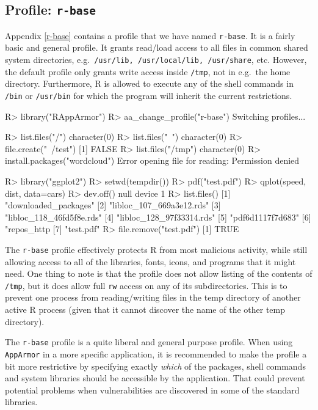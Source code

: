 \documentclass{jss}
\newcommand{\R}{\textsf{R}\xspace}
\newcommand{\AppArmor}{\texttt{AppArmor}\xspace}
\begin{document}
\subsection[Profile: r-base]{Profile: \texttt{r-base}}
\label{r-base-intro}

Appendix \ref{r-base} contains a profile that we have named \texttt{r-base}.
It is a fairly basic and general profile. It grants read/load access to all
files in common shared system directories, e.g.\ \texttt{/usr/lib,
/usr/local/lib, /usr/share}, etc. However, the default profile only grants
write access inside \texttt{/tmp}, not in e.g.\ the home directory. Furthermore,
\R is allowed to execute any of the shell commands in \texttt{/bin}
or \texttt{/usr/bin} for which the program will inherit the current
restrictions.

\begin{CodeChunk}
\begin{CodeInput}
R> library("RAppArmor")
R> aa_change_profile("r-base")
Switching profiles...

R> list.files("/")
character(0)
R> list.files("~")
character(0)
R> file.create("~/test")
[1] FALSE
R> list.files("/tmp")
character(0)
R> install.packages("wordcloud")
Error opening file for reading: Permission denied

R> library("ggplot2")
R> setwd(tempdir())
R> pdf("test.pdf")
R> qplot(speed, dist, data=cars)
R> dev.off()
null device
          1
R> list.files()
[1] "downloaded_packages"
[2] "libloc_107_669a3e12.rds"
[3] "libloc_118_46fd5f8e.rds"
[4] "libloc_128_97f33314.rds"
[5] "pdf6d1117f7d683"
[6] "repos_http%
[7] "test.pdf"
R> file.remove("test.pdf")
[1] TRUE
\end{CodeInput}
\end{CodeChunk}

The \texttt{r-base} profile effectively protects \R from most malicious
activity, while still allowing access to all of the libraries, fonts, icons,
and programs that it might need. One thing to note is that the profile does not
allow listing of the contents of \texttt{/tmp}, but it does allow full
\texttt{rw} access on any of its subdirectories. This is to prevent one process
from reading/writing files in the temp directory of another active \R process
(given that it cannot discover the name of the other temp directory).

The \texttt{r-base} profile is a quite liberal and general purpose profile.
When using \AppArmor in a more specific application, it is recommended to make
the profile a bit more restrictive by specifying exactly \emph{which} of the
packages, shell commands and system libraries should be accessible by the
application. That could prevent potential problems when vulnerabilities are
discovered in some of the standard libraries.
\end{document}
